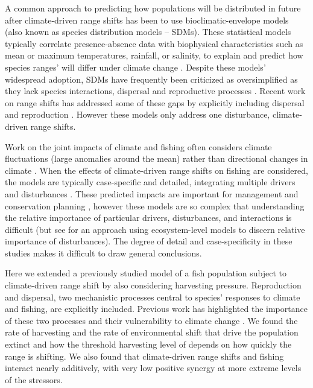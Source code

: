 \documentclass[12pt,english]{article}
\begin{document}
\begin{spacing}{1.9}
\begin{flushleft}
A common approach to predicting how populations will be distributed in future after climate-driven range shifts has been to use bioclimatic-envelope models (also known as species distribution models -- SDMs). These statistical models typically correlate presence-absence data with biophysical characteristics such as mean or maximum temperatures, rainfall, or salinity, to explain and predict how species ranges' will differ under climate change \citep{Elithetal2006, GuisanThuiller2005, GuisanZimmerman2000}. Despite these models' widespread adoption, SDMs have frequently been criticized as oversimplified as they lack species interactions, dispersal and reproductive processes \citep{KearneyPorter2009, Zarnetskeetal2012, Robinsonetal2011}.  Recent work on range shifts has addressed some of these gaps by explicitly including dispersal and reproduction \citep{Berestyckietal2009, ZhouKot2011}. However these models only address one disturbance, climate-driven range shifts. 

Work on the joint impacts of climate and fishing often considers climate fluctuations (large anomalies around the mean) rather than directional changes in climate \citep{WaltersParma1996, KingMcFarlane2006}. When the effects of climate-driven range shifts on fishing are considered, the models are typically case-specific and detailed, integrating multiple drivers and disturbances \citep{Cheungetal2010, Lindegrenetal2010, Brownetal2010, Merinoetal2010, Merinoetal2010b, Plaganyietal2011, Ainsworthetal2011, Zhangetal2011, Barangeetal2011, Howardetal2013}. These predicted impacts are important for management and conservation planning \citep{Allisonetal2009}, however these models are so complex that understanding the relative importance of particular drivers, disturbances, and interactions is difficult (but see \citet{Nyeetal2013} for an approach using ecosystem-level models to discern relative importance of disturbances).  The degree of detail and case-specificity in these studies makes it difficult to draw general conclusions. 

Here we extended a previously studied model of a fish population subject to climate-driven range shift by also considering harvesting pressure. Reproduction and dispersal, two mechanistic processes central to species' responses to climate and fishing, are explicitly included. Previous work has highlighted the importance of these two processes and their vulnerability to climate change \citep{Fordhametal2013, Hastingsetal2005}.  We found the rate of harvesting and the rate of environmental shift that drive the population extinct and how the threshold harvesting level of depends on how quickly the range is shifting.  We also found that climate-driven range shifts and fishing interact nearly additively, with very low positive synergy at more extreme levels of the stressors.  


\end{flushleft}
\end{spacing}
\end{document}
